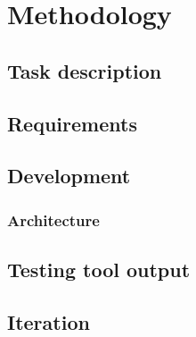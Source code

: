 \chapter{Methodology}\label{cha:methodology}

\section{Task description}

\section{Requirements}

\section{Development}

\subsection{Architecture}

\section{Testing tool output}

\section{Iteration} %